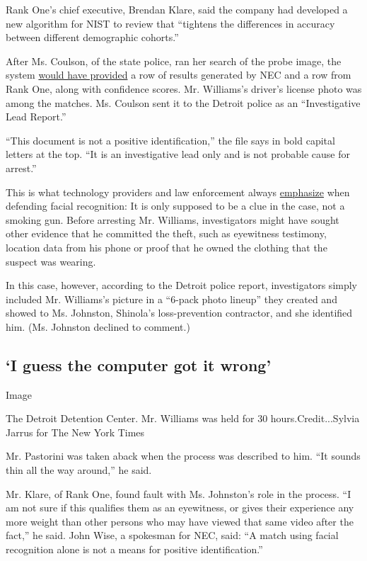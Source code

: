 Rank One's chief executive, Brendan Klare, said the company had
developed a new algorithm for NIST to review that ``tightens the
differences in accuracy between different demographic cohorts.''

After Ms. Coulson, of the state police, ran her search of the probe
image, the system
\href{https://www.michigan.gov/documents/msp/Facial_Recognition_FAQ_666807_7.pdf}{would
have provided} a row of results generated by NEC and a row from Rank
One, along with confidence scores. Mr. Williams's driver's license photo
was among the matches. Ms. Coulson sent it to the Detroit police as an
``Investigative Lead Report.''

``This document is not a positive identification,'' the file says in
bold capital letters at the top. ``It is an investigative lead only and
is not probable cause for arrest.''

This is what technology providers and law enforcement always
\href{https://www.nytimes3xbfgragh.onion/2019/07/08/us/detroit-facial-recognition-cameras.html}{emphasize}
when defending facial recognition: It is only supposed to be a clue in
the case, not a smoking gun. Before arresting Mr. Williams,
investigators might have sought other evidence that he committed the
theft, such as eyewitness testimony, location data from his phone or
proof that he owned the clothing that the suspect was wearing.

In this case, however, according to the Detroit police report,
investigators simply included Mr. Williams's picture in a ``6-pack photo
lineup'' they created and showed to Ms. Johnston, Shinola's
loss-prevention contractor, and she identified him. (Ms. Johnston
declined to comment.)

\hypertarget{i-guess-the-computer-got-it-wrong}{%
\subsection{`I guess the computer got it
wrong'}\label{i-guess-the-computer-got-it-wrong}}

Image

The Detroit Detention Center. Mr. Williams was held for 30
hours.Credit...Sylvia Jarrus for The New York Times

Mr. Pastorini was taken aback when the process was described to him.
``It sounds thin all the way around,'' he said.

Mr. Klare, of Rank One, found fault with Ms. Johnston's role in the
process. ``I am not sure if this qualifies them as an eyewitness, or
gives their experience any more weight than other persons who may have
viewed that same video after the fact,'' he said. John Wise, a spokesman
for NEC, said: ``A match using facial recognition alone is not a means
for positive identification.''

